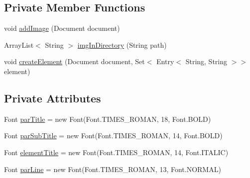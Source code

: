 \subsection*{Private Member Functions}
\begin{DoxyCompactItemize}
\item 
void \hyperlink{classit_1_1isislab_1_1masonhelperdocumentation_1_1mason_1_1control_1_1_p_d_f_generator_abc1f7c0af1e9a3328d917e6e1751d421}{add\-Image} (Document document)
\item 
Array\-List$<$ String $>$ \hyperlink{classit_1_1isislab_1_1masonhelperdocumentation_1_1mason_1_1control_1_1_p_d_f_generator_a9fa1dfe581da4d09e9c7bee1a8b12972}{img\-In\-Directory} (String path)
\item 
void \hyperlink{classit_1_1isislab_1_1masonhelperdocumentation_1_1mason_1_1control_1_1_p_d_f_generator_ac98a9ab63c62a942fc1d410aab226e36}{create\-Element} (Document document, Set$<$ Entry$<$ String, String $>$$>$ element)
\end{DoxyCompactItemize}
\subsection*{Private Attributes}
\begin{DoxyCompactItemize}
\item 
Font \hyperlink{classit_1_1isislab_1_1masonhelperdocumentation_1_1mason_1_1control_1_1_p_d_f_generator_a74f4e5e2095668aa762c3c3df4325c74}{par\-Title} = new Font(Font.\-T\-I\-M\-E\-S\-\_\-\-R\-O\-M\-A\-N, 18, Font.\-B\-O\-L\-D)
\item 
Font \hyperlink{classit_1_1isislab_1_1masonhelperdocumentation_1_1mason_1_1control_1_1_p_d_f_generator_ac4f2d6c81c14b60dcddfc358b9296ee5}{par\-Sub\-Title} = new Font(Font.\-T\-I\-M\-E\-S\-\_\-\-R\-O\-M\-A\-N, 14, Font.\-B\-O\-L\-D)
\item 
Font \hyperlink{classit_1_1isislab_1_1masonhelperdocumentation_1_1mason_1_1control_1_1_p_d_f_generator_aef4e775d865ce931436933184abfcafa}{element\-Title} = new Font(Font.\-T\-I\-M\-E\-S\-\_\-\-R\-O\-M\-A\-N, 14, Font.\-I\-T\-A\-L\-I\-C)
\item 
Font \hyperlink{classit_1_1isislab_1_1masonhelperdocumentation_1_1mason_1_1control_1_1_p_d_f_generator_a4887bc031c4ee6469cf807e7cd1afca6}{par\-Line} = new Font(Font.\-T\-I\-M\-E\-S\-\_\-\-R\-O\-M\-A\-N, 13, Font.\-N\-O\-R\-M\-A\-L)
\end{DoxyCompactItemize}
